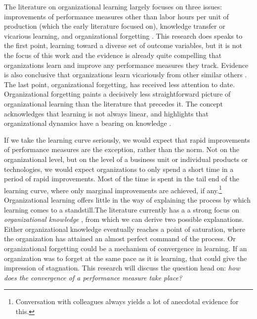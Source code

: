The literature on organizational learning largely focuses on three issues: improvements of performance measures other than labor hours per unit of production (which the early literature focused on), knowledge transfer or vicarious learning, and organizational forgetting \citep{Argote2013-1}. This research does speaks to the first point, learning toward a diverse set of outcome variables, but it is not the focus of this work and the evidence is already quite compelling that organizations learn and improve any performance measures they track. Evidence is also conclusive that organizations learn vicariously from other similar others \citep{Kim2007}. The last point, organizational forgetting, has received less attention to date. Organizational forgetting paints a decisively less straightforward picture of organizational learning than the literature that precedes it. The concept acknowledges that learning is not always linear, and highlights that organizational dynamics have a bearing on knowledge \citep{Argote2013-3}.

If we take the learning curve seriously, we would expect that rapid improvements of performance measures are the exception, rather than the norm. Not on the organizational level, but on the level of a business unit or individual products or technologies, we would expect organizations to only spend a short time in a period of rapid improvements. Most of the time is spent in the tail end of the learning curve, where only marginal improvements are achieved, if any.\footnote{Conversation with colleagues always yields a lot of anecdotal evidence for this.} Organizational learning offers little in the way of explaining the process by which learning comes to a standstill.The literature currently has a a strong focus on \textit{organizational knowledge} \citep{Bingham2011}, from which we can derive two possible explanations. Either organizational knowledge eventually reaches a point of saturation, where the organization has attained an almost perfect command of the process. Or organizational forgetting could be a mechanism of convergence in learning. If an organization was to forget at the same pace as it is learning, that could give the impression of stagnation. This research will discuss the question head on: \textit{how does the convergence of a performance measure take place?}

